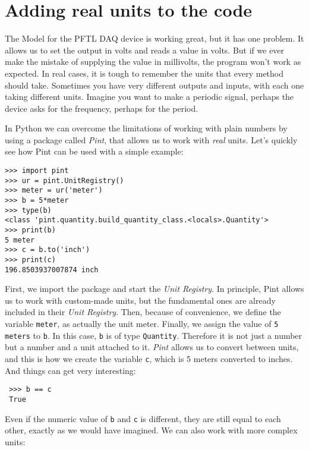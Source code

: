 
\section{Adding real units to the code}\label{sec:pint}
The Model for the {PFTL DAQ} device is working great, but it has one problem. It allows us to set the output in volts and reads a value in volts. But if we ever make the mistake of supplying the value in millivolts, the program won't work as expected. In real cases, it is tough to remember the units that every method should take. Sometimes you have very different outputs and inputs, with each one taking different units. Imagine you want to make a periodic signal, perhaps the device asks for the frequency, perhaps for the period.

In Python we can overcome the limitations of working with plain numbers by using a package called \emph{Pint}, that allows us to work with \emph{real} units. Let's quickly see how Pint can be used with a simple example:

\begin{verbatim}
>>> import pint
>>> ur = pint.UnitRegistry()
>>> meter = ur('meter')
>>> b = 5*meter
>>> type(b)
<class 'pint.quantity.build_quantity_class.<locals>.Quantity'>
>>> print(b)
5 meter
>>> c = b.to('inch')
>>> print(c)
196.8503937007874 inch
\end{verbatim}

First, we import the package and start the \emph{Unit Registry}. In principle, Pint allows us to work with custom-made units, but the fundamental ones are already included in their \emph{Unit Registry}. Then, because of convenience, we define the variable \texttt{meter}, as actually the unit meter. Finally, we assign the value of \texttt{5 meters} to \texttt{b}. In this case, \texttt{b} is of type \texttt{Quantity}. Therefore it is not just a number but a number and a unit attached to it. \emph{Pint} allows us to convert between units, and this is how we create the variable \texttt{c}, which is 5 meters converted to inches. And things can get very interesting:

\begin{verbatim}
 >>> b == c
 True
\end{verbatim}

Even if the numeric value of \texttt{b} and \texttt{c} is different, they are still equal to each other, exactly as we would have imagined. We can also work with more complex units:

